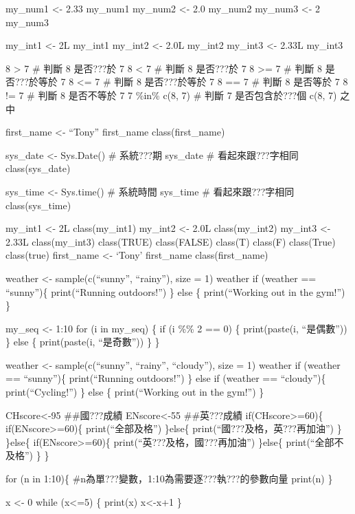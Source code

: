 \documentclass[]{article}
\title{}
\author{}
\date{}
\begin{document}
my\_num1 \textless{}- 2.33 my\_num1 my\_num2 \textless{}- 2.0 my\_num2
my\_num3 \textless{}- 2 my\_num3

my\_int1 \textless{}- 2L my\_int1 my\_int2 \textless{}- 2.0L my\_int2
my\_int3 \textless{}- 2.33L my\_int3

8 \textgreater{} 7 \# 判斷 8 是否???於 7 8 \textless{} 7 \# 判斷 8
是否???於 7 8 \textgreater{}= 7 \# 判斷 8 是否???於等於 7 8 \textless{}=
7 \# 判斷 8 是否???於等於 7 8 == 7 \# 判斷 8 是否等於 7 8 != 7 \# 判斷 8
是否不等於 7 7 \%in\% c(8, 7) \# 判斷 7 是否包含於???個 c(8, 7) 之中

first\_name \textless{}- ``Tony'' first\_name class(first\_name)

sys\_date \textless{}- Sys.Date() \# 系統???期 sys\_date \#
看起來跟???字相同 class(sys\_date)

sys\_time \textless{}- Sys.time() \# 系統時間 sys\_time \#
看起來跟???字相同 class(sys\_time)

my\_int1 \textless{}- 2L class(my\_int1) my\_int2 \textless{}- 2.0L
class(my\_int2) my\_int3 \textless{}- 2.33L class(my\_int3) class(TRUE)
class(FALSE) class(T) class(F) class(True) class(true) first\_name
\textless{}- `Tony' first\_name class(first\_name)

weather \textless{}- sample(c(``sunny'', ``rainy''), size = 1) weather
if (weather == ``sunny'')\{ print(``Running outdoors!'') \} else \{
print(``Working out in the gym!'') \}

my\_seq \textless{}- 1:10 for (i in my\_seq) \{ if (i \%\% 2 == 0) \{
print(paste(i, ``是偶數'')) \} else \{ print(paste(i, ``是奇數'')) \} \}

weather \textless{}- sample(c(``sunny'', ``rainy'', ``cloudy''), size =
1) weather if (weather == ``sunny'')\{ print(``Running outdoors!'') \}
else if (weather == ``cloudy'')\{ print(``Cycling!'') \} else \{
print(``Working out in the gym!'') \}

CHscore\textless{}-95 \#\#國???成績 ENscore\textless{}-55 \#\#英???成績
if(CHscore\textgreater{}=60)\{ if(ENscore\textgreater{}=60)\{
print(``全部及格'') \}else\{ print(``國???及格，英???再加油'') \}
\}else\{ if(ENscore\textgreater{}=60)\{
print(``英???及格，國???再加油'') \}else\{ print(``全部不及格'') \} \}

for (n in 1:10)\{ \#n為單???變數，1:10為需要逐???執???的參數向量
print(n) \}

x \textless{}- 0 while (x\textless{}=5) \{ print(x) x\textless{}-x+1 \}
\end{document}
